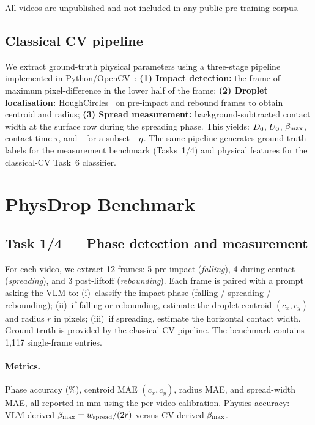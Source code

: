 \documentclass[10pt,twocolumn,letterpaper]{article}
\begin{document}
All videos are unpublished and not included in any public pre-training corpus.

\subsection{Classical CV pipeline}

We extract ground-truth physical parameters using a three-stage pipeline
implemented in Python/OpenCV~\cite{opencv}:
\textbf{(1) Impact detection:} the frame of maximum pixel-difference in the
lower half of the frame;
\textbf{(2) Droplet localisation:} HoughCircles~\cite{opencv} on pre-impact
and rebound frames to obtain centroid and radius;
\textbf{(3) Spread measurement:} background-subtracted contact width at the
surface row during the spreading phase.
This yields: $D_0$, $U_0$, $\beta_{\max}$, contact time $\tau$, and—for
a subset—$\eta$.
The same pipeline generates ground-truth labels for the measurement benchmark
(Tasks~1/4) and physical features for the classical-CV Task~6 classifier.

\section{PhysDrop Benchmark}
\label{sec:benchmark}

\subsection{Task 1/4 — Phase detection and measurement}
\label{sec:task14}

For each video, we extract 12 frames: 5 pre-impact (\emph{falling}), 4
during contact (\emph{spreading}), and 3 post-liftoff (\emph{rebounding}).
Each frame is paired with a prompt asking the VLM to:
(i)~classify the impact phase (falling / spreading / rebounding);
(ii)~if falling or rebounding, estimate the droplet centroid $(c_x, c_y)$
and radius $r$ in pixels;
(iii)~if spreading, estimate the horizontal contact width.
Ground-truth is provided by the classical CV pipeline.
The benchmark contains 1{,}117 single-frame entries.

\paragraph{Metrics.}
Phase accuracy (\%), centroid MAE $(c_x, c_y)$, radius MAE, and spread-width
MAE, all reported in mm using the per-video calibration.
Physics accuracy: VLM-derived $\beta_{\max} = w_{\text{spread}} / (2r)$ versus
CV-derived $\beta_{\max}$.
\end{document}
